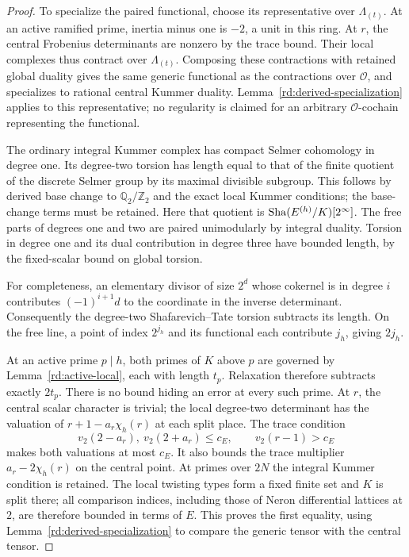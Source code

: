 \begin{proof}
To specialize the paired functional, choose its representative
over \(\Lambda_{(t)}\).  At an active ramified prime, inertia
minus one is \(-2\), a unit in this ring.  At \(r\), the
central Frobenius determinants are nonzero by the trace bound.
Their local complexes thus contract over \(\Lambda_{(t)}\).
Composing these contractions with retained global duality gives
the same generic functional as the contractions over
\(\mathcal O\), and specializes to rational central Kummer
duality.  Lemma~\ref{rd:derived-specialization} applies to this
representative; no regularity is claimed for an arbitrary
\(\mathcal O\)-cochain representing the functional.

The ordinary integral Kummer complex has compact Selmer
cohomology in degree one.  Its degree-two torsion has
length equal to that of the finite quotient of the
discrete Selmer group by its maximal divisible subgroup.
This follows by derived base change to
\(\mathbb Q_2/\mathbb Z_2\) and the exact local Kummer
conditions; the base-change terms must be retained.
Here that quotient is \(\operatorname{Sha}(E^{(h)}/K)[2^\infty]\).
The free parts of degrees one and two are paired
unimodularly by integral duality.  Torsion in degree
one and its dual contribution in degree three have
bounded length, by the fixed-scalar bound on global
torsion.

For completeness, an elementary divisor of size \(2^d\)
whose cokernel is in degree \(i\) contributes
\((-1)^{i+1}d\) to the coordinate in the inverse
determinant.  Consequently the degree-two
Shafarevich--Tate torsion subtracts its length.  On
the free line, a point of index \(2^{j_h}\) and its
functional each contribute \(j_h\), giving \(2j_h\).

At an active prime \(p\mid h\), both primes of \(K\)
above \(p\) are governed by
Lemma~\ref{rd:active-local}, each with length \(t_p\).
Relaxation therefore subtracts exactly \(2t_p\).
There is no bound hiding an error at every such prime.
At \(r\), the central scalar character is trivial;
the local degree-two determinant has the valuation
of \(r+1-a_r\chi_h(r)\) at each split place.
The trace condition
\[
 v_2(2-a_r),\ v_2(2+a_r)\le c_E,\qquad
 v_2(r-1)>c_E
 \]
makes both valuations at most \(c_E\).  It also bounds
the trace multiplier
\(a_r-2\chi_h(r)\) on the central point.
At primes over \(2N\) the integral Kummer condition
is retained.  The local twisting types form a fixed
finite set and \(K\) is split there; all comparison
indices, including those of Neron differential
lattices at \(2\), are therefore bounded in terms
of \(E\).  This proves the first equality, using
Lemma~\ref{rd:derived-specialization} to compare
the generic tensor with the central tensor.


\end{proof}
